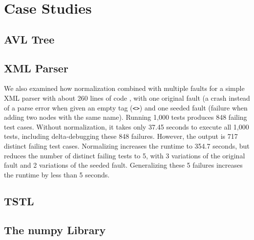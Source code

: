 \section {Case Studies}

\subsection{AVL Tree}

\subsection{XML Parser}

We also examined how normalization combined with multiple faults for a
simple XML parser with about 260 lines of code \cite{myxml}, with one
original fault (a crash instead of a parse error when given an empty
tag ({\tt <>}) and one seeded fault (failure when adding two nodes
with the same name).  Running 1,000 tests produces 848 failing test
cases.  Without normalization, it takes only 37.45 seconds to execute
all 1,000 tests, including delta-debugging these 848 failures.
However, the output is 717 distinct failing test cases.  Normalizing
increases the runtime to 354.7 seconds, but reduces the number of
distinct failing tests to 5, with 3 variations of the original fault
and 2 variations of the seeded fault.  Generalizing these 5 failures
increases the runtime by less than 5 seconds.

\subsection{TSTL}

\subsection{The numpy Library}

